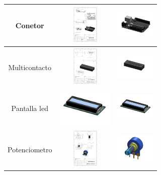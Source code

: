 \begin{itemize}
\begin{table} [H]
\begin{tabular}   {| c |  c |  c | }
        \hline
       Conetor &  \includegraphics[height=19mm]{1/img/Conector.pdf}  & 
       \includegraphics[width=19mm]{1/img/Conector_1.pdf} \\
        \hline
        Multicontacto &  \includegraphics[height=19mm]{1/img/Multicontacto.pdf}  & 
       \includegraphics[width=19mm]{1/img/Multicontacto_1.pdf} \\
        \hline
        Pantalla led & \includegraphics[height=19mm]{1/img/Pantalla Led.pdf}  & 
       \includegraphics[width=19mm]{1/img/Pantalla Led_1.pdf} \\
        \hline
       Potenciometro & \includegraphics[height=19mm]{1/img/Potenciometro.pdf}  & 
       \includegraphics[width=19mm]{1/img/Potenciometro_1.pdf} \\
        \hline
       

\end{tabular}
\end{table}
\end{itemize}
